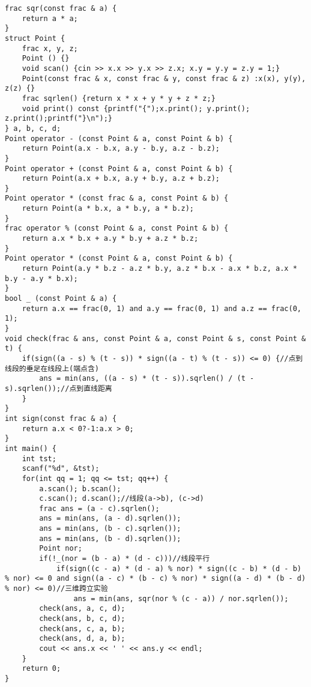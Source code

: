 \begin{lstlisting}
frac sqr(const frac & a) {
	return a * a;
}
struct Point {
	frac x, y, z;
	Point () {}
	void scan() {cin >> x.x >> y.x >> z.x; x.y = y.y = z.y = 1;}
	Point(const frac & x, const frac & y, const frac & z) :x(x), y(y), z(z) {}
	frac sqrlen() {return x * x + y * y + z * z;}
	void print() const {printf("{");x.print(); y.print(); z.print();printf("}\n");}
} a, b, c, d;
Point operator - (const Point & a, const Point & b) {
	return Point(a.x - b.x, a.y - b.y, a.z - b.z);
}
Point operator + (const Point & a, const Point & b) {
	return Point(a.x + b.x, a.y + b.y, a.z + b.z);
}
Point operator * (const frac & a, const Point & b) {
	return Point(a * b.x, a * b.y, a * b.z);
}
frac operator % (const Point & a, const Point & b) {
	return a.x * b.x + a.y * b.y + a.z * b.z;
}
Point operator * (const Point & a, const Point & b) {
	return Point(a.y * b.z - a.z * b.y, a.z * b.x - a.x * b.z, a.x * b.y - a.y * b.x);
}
bool _ (const Point & a) {
	return a.x == frac(0, 1) and a.y == frac(0, 1) and a.z == frac(0, 1);
}
void check(frac & ans, const Point & a, const Point & s, const Point & t) {
	if(sign((a - s) % (t - s)) * sign((a - t) % (t - s)) <= 0) {//点到线段的垂足在线段上(端点含)
		ans = min(ans, ((a - s) * (t - s)).sqrlen() / (t - s).sqrlen());//点到直线距离
	}
}
int sign(const frac & a) {
	return a.x < 0?-1:a.x > 0;
}
int main() {
	int tst;
	scanf("%d", &tst);
	for(int qq = 1; qq <= tst; qq++) {
		a.scan(); b.scan();
		c.scan(); d.scan();//线段(a->b), (c->d)
		frac ans = (a - c).sqrlen();
		ans = min(ans, (a - d).sqrlen());
		ans = min(ans, (b - c).sqrlen());
		ans = min(ans, (b - d).sqrlen());
		Point nor;
		if(!_(nor = (b - a) * (d - c)))//线段平行
			if(sign((c - a) * (d - a) % nor) * sign((c - b) * (d - b) % nor) <= 0 and sign((a - c) * (b - c) % nor) * sign((a - d) * (b - d) % nor) <= 0)//三维跨立实验
				ans = min(ans, sqr(nor % (c - a)) / nor.sqrlen());
		check(ans, a, c, d);
		check(ans, b, c, d);
		check(ans, c, a, b);
		check(ans, d, a, b);
		cout << ans.x << ' ' << ans.y << endl;
	}
	return 0;
}
\end{lstlisting}
